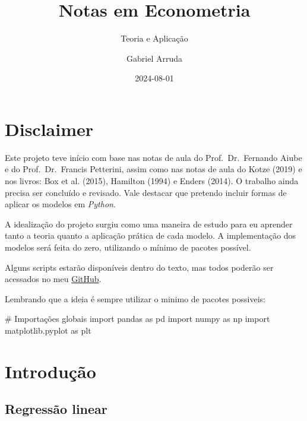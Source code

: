 \documentclass[
  letterpaper,
  DIV=11,
  numbers=noendperiod]{scrreprt}
\title{Notas em Econometria}
\subtitle{Teoria e Aplicação}
\author{Gabriel Arruda}
\date{2024-08-01}
\newenvironment{Shaded}{\begin{snugshade}}{\end{snugshade}}
\newcommand{\CommentTok}[1]{\textcolor[rgb]{0.37,0.37,0.37}{#1}}
\newcommand{\ImportTok}[1]{\textcolor[rgb]{0.00,0.46,0.62}{#1}}
\newcommand{\NormalTok}[1]{\textcolor[rgb]{0.00,0.23,0.31}{#1}}
\renewcommand*\contentsname{Índice}
\newcommand\contentsname{Índice}
\theoremstyle{definition}
\theoremstyle{plain}
\theoremstyle{remark}
\begin{document}
\maketitle

\renewcommand*\contentsname{Índice}
{
\hypersetup{linkcolor=}
\setcounter{tocdepth}{2}
\tableofcontents
}


\chapter*{Disclaimer}\label{disclaimer}


Este projeto teve início com base nas notas de aula do
Prof.~Dr.~Fernando Aiube e do Prof.~Dr.~Francis Petterini, assim como
nas notas de aula do Kotze (2019) e nos livros: Box et al. (2015),
Hamilton (1994) e Enders (2014). O trabalho ainda precisa ser concluído
e revisado. Vale destacar que pretendo incluir formas de aplicar os
modelos em \textit{Python}.

A idealização do projeto surgiu como uma maneira de estudo para eu
aprender tanto a teoria quanto a aplicação prática de cada modelo. A
implementação dos modelos será feita do zero, utilizando o mínimo de
pacotes possível.

Alguns scripts estarão disponíveis dentro do texto, mas todos poderão
ser acessados no meu \href{https://github.com/g-arruda}{GitHub}.

Lembrando que a ideia é sempre utilizar o minimo de pacotes possiveis:

\begin{Shaded}
\begin{Highlighting}[]
\CommentTok{\# Importações globais}
\ImportTok{import}\NormalTok{ pandas }\ImportTok{as}\NormalTok{ pd}
\ImportTok{import}\NormalTok{ numpy }\ImportTok{as}\NormalTok{ np}
\ImportTok{import}\NormalTok{ matplotlib.pyplot }\ImportTok{as}\NormalTok{ plt}
\end{Highlighting}
\end{Shaded}


\chapter{Introdução}\label{introduuxe7uxe3o}

\section{Regressão linear}\label{regressuxe3o-linear}
\end{document}
